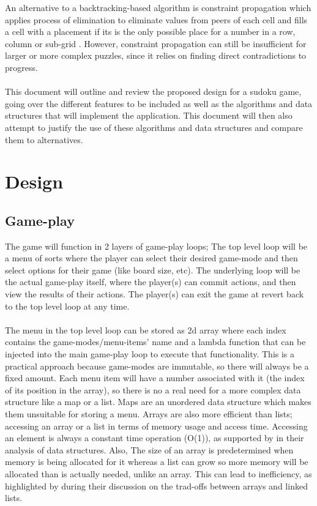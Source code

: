 \documentclass{article}
\begin{document}
An alternative to a backtracking-based algorithm is constraint propagation which applies process of elimination to eliminate values from peers of each cell and fills a cell with a placement if its is the only possible place for a number in a row, column or sub-grid  \parencite{simonis2005}. However, constraint propagation can still be insufficient for larger or more complex puzzles, since it relies on finding direct contradictions to progress.\\\\
This document will outline and review the proposed design for a sudoku game, going over the different features to be included as well as the algorithms and data structures that will implement the application. This document will then also attempt to justify the use of these algorithms and data structures and compare them to alternatives.

\section{Design}
\subsection{Game-play}
The game will function in 2 layers of game-play loops; The top level loop will be a menu of sorts where the player can select their desired game-mode and then select options for their game (like board size, etc). The underlying loop will be the actual game-play itself, where the player(s) can commit actions, and then view the results of their actions. The player(s) can exit the game at revert back to the top level loop at any time. \\\\
The menu in the top level loop can be stored as 2d array where each index contains the game-modes/menu-items' name and a lambda function that can be injected into the main game-play loop to execute that functionality. This is a practical approach because game-modes are immutable, so there will always be a fixed amount. Each menu item will have a number associated with it (the index of its position in the array), so there is no a real need for a more complex data structure like a map or a list. Maps are an unordered data structure which makes them unsuitable for storing a menu. Arrays are also more efficient than lists; accessing an array or a list in terms of memory usage and access time. Accessing an element is always a constant time operation (O(1)), as supported by \parencite{cormen2009} in their analysis of data structures. Also, The size of an array is predetermined when memory is being allocated for it whereas a list can grow so more memory will be allocated than is actually needed, unlike an array. This can lead to inefficiency, as highlighted by \parencite{sedgewick2011} during their discussion on the trad-offs between arrays and linked lists.
\end{document}
